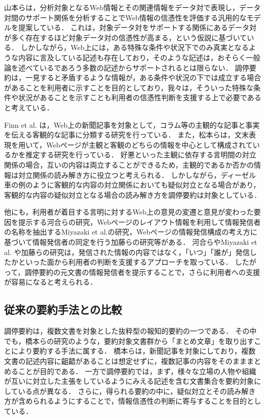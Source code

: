 \documentclass[japanese]{jnlp_1.4}
\begin{document}
山本ら\cite{Yamamoto2010}は，分析対象となるWeb情報とその関連情報をデータ対で表現し，データ対間のサポート関係を分析することでWeb情報の信憑性を評価する汎用的なモデルを提案している．
これは，対象データ対をサポートする関係にあるデータ対が多く存在するほど対象データ対の信憑性が高まる，という仮説に基づいている．
しかしながら，Web上には，ある特殊な条件や状況下でのみ真実となるような内容に言及している記述も存在しており，そのような記述は，おそらく一般論を述べているであろう多数の記述からサポートされるとは限らない．
調停要約は，一見すると矛盾するような情報が，ある条件や状況の下では成立する場合があることを利用者に示すことを目的としており，我々は，そういった特殊な条件や状況があることを示すことも利用者の信憑性判断を支援する上で必要であると考えている．

Finn et al. \cite{Finn2001}は，Web上の新聞記事を対象として，コラム等の主観的な記事と事実を伝える客観的な記事に分類する研究を行っている．
また，松本ら\cite{Matsumoto2009}は，文末表現を用いて，Webページが主観と客観のどちらの情報を中心として構成されているかを推定する研究を行っている．
好悪といった主観に依存する言明間の対立関係の場合，互いの内容は両立することができるため，主観的であるか否かの情報は対立関係の読み解き方に役立つと考えられる．
しかしながら，ディーゼル車の例のように客観的な内容の対立関係においても疑似対立となる場合があり，客観的な内容の疑似対立となる場合の読み解き方を調停要約は対象としている．

他にも，利用者が着目する言明に対するWeb上の意見の変遷と意見が変わった要因を提示する河合らの研究\cite{Kawai2011}，Webページのレイアウト情報を利用して情報発信者の名称を抽出するMiyazaki et al.の研究\cite{Miyazaki2009}，Webページの情報発信構成の考え方に基づいて情報発信者の同定を行う加藤らの研究\cite{Kato2010}等がある．
河合ら\cite{Kawai2011}やMiyazaki et al. \citeyear{Miyazaki2009}や加藤ら\cite{Kato2010}の研究は，発信された情報の内容ではなく，「いつ」「誰が」発信したかといった面から利用者の判断を支援するアプローチを取っている．
したがって，調停要約の元文書の情報発信者を提示することで，さらに利用者への支援が容易になると考えられる．


\subsection{従来の要約手法との比較}

調停要約は，複数文書を対象とした抜粋型の報知的要約の一つである．
その中でも，橋本ら\cite{Hashimoto2001}の研究のような，要約対象文書群から「まとめ文章」を取り出すことにより要約する手法に属する．
橋本ら\cite{Hashimoto2001}は，新聞記事を対象にしており，複数文書の記述内容に齟齬があることは想定せずに，複数記事の内容をそのまままとめることが目的である．
一方で調停要約では，まず，様々な立場の人物や組織が互いに対立した主張をしているようにみえる記述を含む文書集合を要約対象にしている点が異なる．
さらに，得られる要約の中に，疑似対立とその読み解き方が含められるようにすることで，情報信憑性の判断に寄与することを目的としている．
\end{document}
